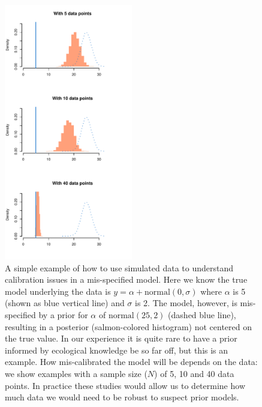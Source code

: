 \documentclass[11pt]{article}
\providecommand{\DIFaddbeginFL}{} %
\providecommand{\DIFaddendFL}{} %
\providecommand{\DIFdelbeginFL}{} %
\providecommand{\DIFdelendFL}{} %
\newcommand{\DIFscaledelfig}{0.5}
\newlength{\DIFdelgraphicswidth} %
\newlength{\DIFdelgraphicsheight} %
\newcommand{\DIFaddincludegraphics}[2][]{{\color{blue}\fbox{\DIFOincludegraphics[#1]{#2}}}} %
\newcommand{\DIFdelincludegraphics}[2][]{%
\sbox{\DIFdelgraphicsbox}{\DIFOincludegraphics[#1]{#2}}%
\settoboxwidth{\DIFdelgraphicswidth}{\DIFdelgraphicsbox} %
\settoboxtotalheight{\DIFdelgraphicsheight}{\DIFdelgraphicsbox} %
\scalebox{\DIFscaledelfig}{%
\parbox[b]{\DIFdelgraphicswidth}{\usebox{\DIFdelgraphicsbox}\\[-\baselineskip] \rule{\DIFdelgraphicswidth}{0em}}\llap{\resizebox{\DIFdelgraphicswidth}{\DIFdelgraphicsheight}{%
\setlength{\unitlength}{\DIFdelgraphicswidth}%
\begin{picture}(1,1)%
\thicklines\linethickness{2pt} %
{\color[rgb]{1,0,0}\put(0,0){\framebox(1,1){}}}%
{\color[rgb]{1,0,0}\put(0,0){\line( 1,1){1}}}%
{\color[rgb]{1,0,0}\put(0,1){\line(1,-1){1}}}%
\end{picture}%
}\hspace*{3pt}}} %
} %
\DeclareRobustCommand{\DIFaddbeginFL}{\DIFOaddbeginFL \let\includegraphics\DIFaddincludegraphics} %
\DeclareRobustCommand{\DIFaddendFL}{\DIFOaddendFL \let\includegraphics\DIFOincludegraphics} %
\DeclareRobustCommand{\DIFdelbeginFL}{\DIFOdelbeginFL \let\includegraphics\DIFdelincludegraphics} %
\DeclareRobustCommand{\DIFdelendFL}{\DIFOaddendFL \let\includegraphics\DIFOincludegraphics} %
\begin{document}
\begin{figure}[ht]
\centering
\noindent \DIFdelbeginFL %
\DIFdelendFL \DIFaddbeginFL \includegraphics[width=0.5\textwidth]{examples/misspecifiedmodel/priorpostforflows.pdf}
\DIFaddendFL \caption{A simple example of how to use simulated data to understand calibration issues in a mis-specified model. Here we know the true model underlying the data is $y=\alpha + \text{normal}(0, \sigma)$ where $\alpha$ is 5 (shown as blue vertical line) and $\sigma$ is 2. The model, however, is mis-specified by a prior for $\alpha$ of $\text{normal}(25, 2)$ (dashed blue line), resulting in a posterior (salmon-colored histogram) not centered on the true value. In our experience it is quite rare to have a prior informed by ecological knowledge be so far off, but this is an example. How mis-calibrated the model will be depends on the data: we show examples with a sample size ($N$) of 5, 10 and 40 data points. In practice these studies would allow us to determine how much data we would need to be robust to suspect prior models. }
\label{fig:misspecifyprior}
\end{figure}
\end{document}
